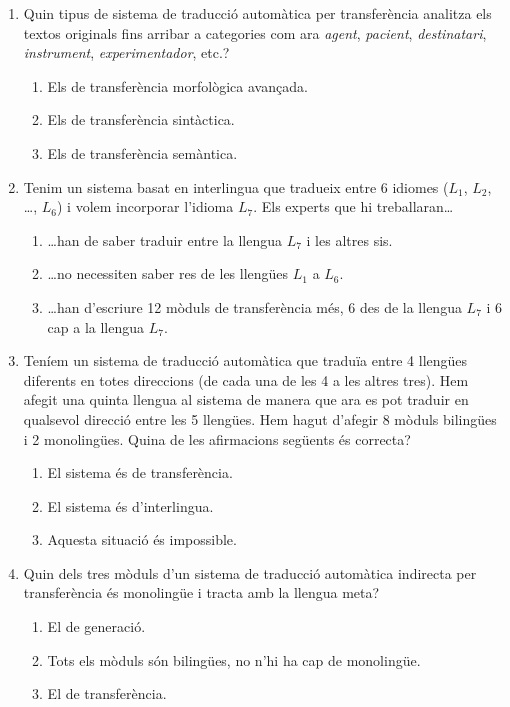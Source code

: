 \begin{enumerate}
\item Quin tipus de sistema de traducció automàtica per transferència
  analitza els textos originals fins arribar a categories com ara
  \emph{agent}, \emph{pacient}, \emph{destinatari}, \emph{instrument},
  \emph{experimentador}, etc.?
  \begin{enumerate}
  \item Els de transferència morfològica avançada.
  \item Els de transferència sintàctica.
  \item Els de transferència semàntica.
  \end{enumerate}

\item Tenim un sistema basat en interlingua que tradueix entre 6
  idiomes ($L_1$, $L_2$, \ldots, $L_6$) i volem incorporar l'idioma
  $L_7$. Els experts que hi treballaran\ldots
  \begin{enumerate}
  \item \ldots han de saber traduir entre la llengua $L_7$ i les
    altres sis.
  \item \ldots no necessiten saber res de les llengües $L_1$ a $L_6.$
  \item \ldots han d'escriure 12 mòduls de transferència més, 6 des de
    la llengua $L_7$ i 6 cap a la llengua $L_7$.
  \end{enumerate}

\item Teníem un sistema de traducció automàtica que traduïa entre 4
  llengües diferents en totes direccions (de cada una de les 4 a les
  altres tres). Hem afegit una quinta llengua al sistema de manera que
  ara es pot traduir en qualsevol direcció entre les 5 llengües. Hem
  hagut d'afegir 8 mòduls bilingües i 2 monolingües. Quina de les
  afirmacions següents és correcta?
  \begin{enumerate}
  \item El sistema és de transferència.
  \item El sistema és d'interlingua.
  \item Aquesta situació és impossible.
  \end{enumerate}

\item Quin dels tres mòduls d'un sistema de traducció automàtica
  indirecta per transferència és monolingüe i tracta amb la llengua
  meta?
  \begin{enumerate}
  \item El de generació.
  \item Tots els mòduls són bilingües, no n'hi ha cap de monolingüe.
  \item El de transferència.
  \end{enumerate}


\end{enumerate}

